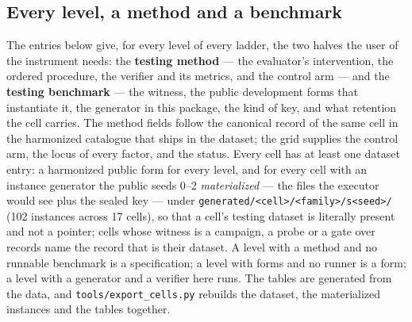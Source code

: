 \documentclass[11pt]{article}
\theoremstyle{definition}
\begin{document}
\subsection{Every level, a method and a benchmark}\label{sec:methods}
The entries below give, for every level of every ladder, the two halves the user of the instrument needs: the \textbf{testing method} --- the evaluator's intervention, the ordered procedure, the verifier and its metrics, and the control arm --- and the \textbf{testing benchmark} --- the witness, the public development forms that instantiate it, the generator in this package, the kind of key, and what retention the cell carries. The method fields follow the canonical record of the same cell in the harmonized catalogue that ships in the dataset; the grid supplies the control arm, the locus of every factor, and the status. Every cell has at least one dataset entry: a harmonized public form for every level, and for every cell with an instance generator the public seeds 0--2 \emph{materialized} --- the files the executor would see plus the sealed key --- under \texttt{generated/<cell>/<family>/s<seed>/} (102 instances across 17 cells), so that a cell's testing dataset is literally present and not a pointer; cells whose witness is a campaign, a probe or a gate over records name the record that is their dataset. A level with a method and no runnable benchmark is a specification; a level with forms and no runner is a form; a level with a generator and a verifier here runs. The tables are generated from the data, and \texttt{tools/export\_cells.py} rebuilds the dataset, the materialized instances and the tables together.


\end{document}

